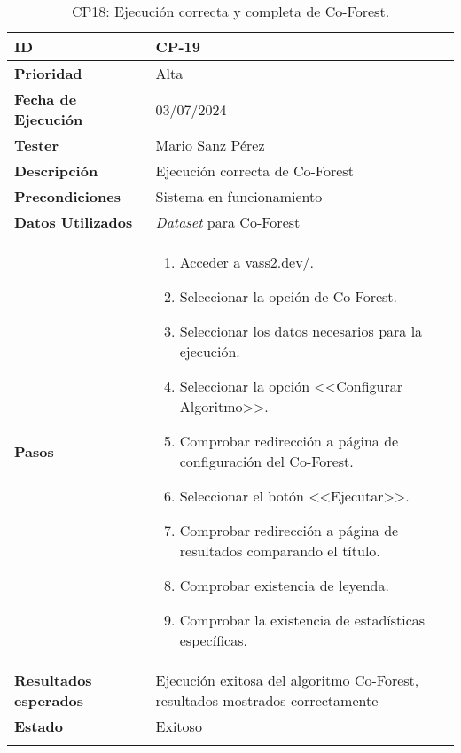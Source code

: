 \begin{longtable}{>{\raggedright\arraybackslash}p{4cm} p{9.5cm}}
    \hline
    \rowcolor{gray!20}
    \textbf{ID} & CP-19\\
    \hline
    \rowcolor{white}
    \textbf{Prioridad} & Alta \\
    \hline
    \rowcolor{gray!20}
    \textbf{Fecha de Ejecución} & 03/07/2024 \\
    \hline
    \rowcolor{white}
    \textbf{Tester} & Mario Sanz Pérez \\
    \hline
    \rowcolor{gray!20}
    \textbf{Descripción} & Ejecución correcta de Co-Forest\\
    \hline
    \rowcolor{white}
    \textbf{Precondiciones} & Sistema en funcionamiento\\
    \hline
    \rowcolor{white}
    \textbf{Datos Utilizados} & \textit{Dataset} para Co-Forest\\
    \hline
    \rowcolor{gray!20}
    \textbf{Pasos} & \begin{enumerate}
        \item Acceder a vass2.dev/.
        \item Seleccionar la opción de Co-Forest.
        \item Seleccionar los datos necesarios para la ejecución.
        \item Seleccionar la opción <<Configurar Algoritmo>>.
        \item Comprobar redirección a página de configuración del Co-Forest.
        \item Seleccionar el botón <<Ejecutar>>.
        \item Comprobar redirección a página de resultados comparando el título.
        \item Comprobar existencia de leyenda.
        \item Comprobar la existencia de estadísticas específicas.
    \end{enumerate}\\
	\hline
    \rowcolor{gray!20}
    \textbf{Resultados esperados} & Ejecución exitosa del algoritmo Co-Forest, resultados mostrados correctamente\\
    \hline
    \rowcolor{white}
    \textbf{Estado} & Exitoso\\
    \hline
	\caption[CP19: Ejecución Co-Forest]{CP18: Ejecución correcta y completa de Co-Forest.}
\end{longtable}


